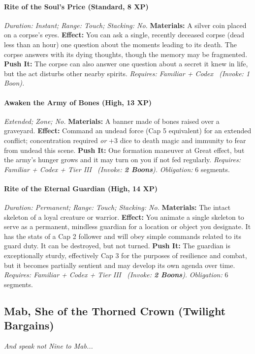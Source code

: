\paragraph{Rite of the Soul's Price (Standard, 8 XP)} \emph{Duration: Instant; Range: Touch; Stacking: No.}
\textbf{Materials:} A silver coin placed on a corpse's eyes.
\textbf{Effect:} You can ask a single, recently deceased corpse (dead less than an hour) one question about the moments leading to its death. The corpse answers with its dying thoughts, though the memory may be fragmented.
\textbf{Push It:} The corpse can also answer one question about a secret it knew in life, but the act disturbs other nearby spirits.
\emph{Requires: Familiar + Codex \ (\textit{Invoke:} 1 Boon).}
\paragraph{Awaken the Army of Bones (High, 13 XP)} \emph{Extended; Zone; No.}
\textbf{Materials:} A banner made of bones raised over a graveyard.
\textbf{Effect:} Command an undead force (Cap 5 equivalent) for an extended conflict; concentration required \emph{or} +3 dice to death magic and immunity to fear from undead this scene.
\textbf{Push It:} One formation maneuver at Great effect, but the army's hunger grows and it may turn on you if not fed regularly.
\emph{Requires: Familiar + Codex + Tier III \ (\textit{Invoke:} \textbf{2 Boons}).}
\emph{Obligation:} 6 segments.

\paragraph{Rite of the Eternal Guardian (High, 14 XP)} \emph{Duration: Permanent; Range: Touch; Stacking: No.}
\textbf{Materials:} The intact skeleton of a loyal creature or warrior.
\textbf{Effect:} You animate a single skeleton to serve as a permanent, mindless guardian for a location or object you designate. It has the stats of a Cap 2 follower and will obey simple commands related to its guard duty. It can be destroyed, but not turned.
\textbf{Push It:} The guardian is exceptionally sturdy, effectively Cap 3 for the purposes of resilience and combat, but it becomes partially sentient and may develop its own agenda over time.
\emph{Requires: Familiar + Codex + Tier III \ (\textit{Invoke:} \textbf{2 Boons}).}
\emph{Obligation:} 6 segments.

\subsection{Mab, She of the Thorned Crown (Twilight Bargains)}
\textit{And speak not Nine to Mab...}
